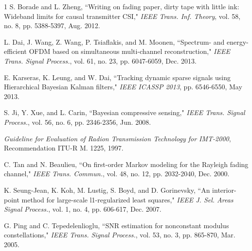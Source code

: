 \documentclass[conference]{IEEEtran}
\begin{document}
\begin{thebibliography}{1}
S. Borade and L. Zheng, ``Writing on fading paper, dirty tape with little ink: Wideband limits for causal transmitter CSI," \emph{IEEE Trans. Inf. Theory}, vol. 58, no. 8, pp. 5388-5397, Aug. 2012.

L. Dai, J. Wang, Z. Wang, P. Tsiaflakis, and M. Moonen, ``Spectrum- and energy-efficient OFDM based on simultaneous multi-channel reconstruction," \emph{IEEE Trans. Signal Process.}, vol. 61, no. 23, pp. 6047-6059, Dec. 2013.

E. Karseras, K. Leung, and W. Dai, ``Tracking dynamic sparse signals using Hierarchical Bayesian Kalman filters," \emph{IEEE ICASSP 2013}, pp. 6546-6550, May 2013.

S. Ji, Y. Xue, and L. Carin, ``Bayesian compressive sensing," \emph{IEEE Trans. Signal Process.}, vol. 56, no. 6, pp. 2346-2356, Jun. 2008.


\emph{Guideline for Evaluation of Radion Transmission Technology for IMT-2000}, Recommendation ITU-R M. 1225, 1997.

C. Tan and N. Beaulieu, ``On first-order Markov modeling for the Rayleigh fading channel," \emph{IEEE Trans. Commun.}, vol. 48, no. 12, pp. 2032-2040, Dec. 2000.

K. Seung-Jean, K. Koh, M. Lustig, S. Boyd, and D. Gorinevsky, ``An interior-point method for large-scale l1-regularized least squares," \emph{IEEE J. Sel. Areas Signal Process.}, vol. 1, no. 4, pp. 606-617, Dec. 2007.

G. Ping and C. Tepedelenlioglu, ``SNR estimation for nonconstant modulus constellations," \emph{IEEE Trans. Signal Process.}, vol. 53, no. 3, pp. 865-870, Mar. 2005.

\end{thebibliography}

\newpage
\end{document}
